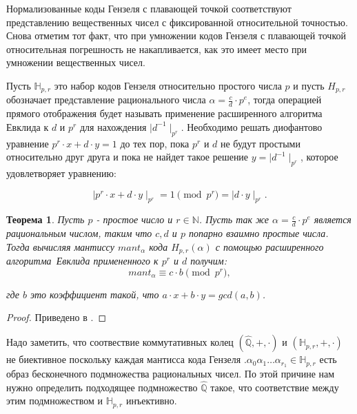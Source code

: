 \documentclass[master, och, diploma, times]{sty/SCWorks}
\theoremstyle{plain}
\newtheorem{thethm}{Теорема}[section]
\theoremstyle{definition}
\numberwithin{equation}{section}
\begin{document}
Нормализованные коды Гензеля с плавающей точкой соответствуют представлению вещественных чисел с фиксированной относительной точностью. Снова отметим тот факт, что при умножении кодов Гензеля с плавающей точкой относительная погрешность не накапливается, как это имеет место при умножении вещественных чисел.

Пусть $\mathbb{H}_{p,r}$ это набор кодов Гензеля относительно простого числа $p$ и пусть $H_{p,r}$ обозначает представление рационального числа $\alpha=\frac{c}{d}\cdot p^e$, тогда операцией прямого отображения будет называть применение расширенного алгоритма Евклида к $d$ и $p^r$ для нахождения $\mid d^{-1} \mid_{p^r}$. Необходимо решать диофантово уравнение $p^r \cdot x + d \cdot y = 1$ до тех пор, пока $p^r$ и $d$ не будут простыми относительно друг друга и пока не найдет такое решение $y=\mid d^{-1} \mid_{p^r}$, которое удовлетворяет уравнению:

\begin{equation}
\mid p^r \cdot x + d \cdot y \mid_{p^r} = 1 \pmod{p^r} = \mid d \cdot y \mid_{p^r}.
\end{equation}


\begin{thethm}\label{th:forward_mapping}
Пусть $p$ - простое число и $r \in \mathbb{N}$. Пусть так же $\alpha=\frac{c}{d} \cdot p^e$ является рациональным числом, таким что $c, d$ и $p$ попарно взаимно простые числа. Тогда вычисляя мантиссу $mant_{\alpha}$ кода $H_{p,r}(\alpha)$ с помощью \mbox{расширенного} \mbox{алгоритма Евклида} примененного к $p^r$ и $d$ получим:
\begin{equation}
mant_{\alpha} \equiv c \cdot b \pmod {p^r},
\end{equation}

\noindent где $b$ это коэффициент такой, что $a\cdot x+b\cdot y = gcd(a,b)$.
\end{thethm}

\begin{proof} 
Приведено в \cite{bib:numbers:miola}.
\end{proof}


Надо заметить, что соотвествие коммутативных колец $(\hat{\mathbb{Q}},+,\cdot)$ и $(\mathbb{H}_{p,r},+,\cdot)$ не биективное поскольку каждая мантисса кода Гензеля $.\alpha_0\alpha_1\dots\alpha_{r_1} \in \mathbb{H}_{p,r}$ есть образ бесконечного подмножества рациональных чисел. По этой причине нам нужно определить подходящее подмножество $\hat{\mathbb{Q}}$ такое, что соответствие между этим подмножеством и $\mathbb{H}_{p,r}$ \mbox{инъективно}.
\end{document}
